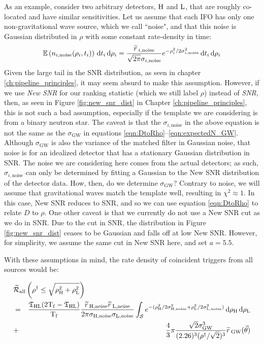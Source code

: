 As an example, consider two arbitrary detectors, $\mathrm{H}$ and $\mathrm{L}$, that are roughly co-located and have similar sensitivities. Let us assume that each \ac{IFO} has only one non-gravitational wave source, which we call ``noise", and that this noise is Gaussian distributed in $\rho$ with some constant rate-density in time:
\begin{equation}
\mathbb{E}\left(n_{i,\mathrm{noise}}(\rho_i,t_i)\right)\,\mathrm{d} t_i \,\mathrm{d}\rho_i = \frac{\widetilde{r}\,_{i,\mathrm{noise}}}{\sqrt{2\pi} \sigma_{i,\mathrm{noise}}} e^{-\rho_i^2 / 2\sigma_{i,\mathrm{noise}}^2} \,\mathrm{d} t_i \,\mathrm{d}\rho_i
\end{equation}
Given the large tail in the \ac{SNR} distribution, as seen in chapter \ref{ch:pipeline_principles}, it may seem absurd to make this assumption. However, if we use \emph{New \ac{SNR}} for our ranking statistic (which we still label $\rho$) instead of \emph{\ac{SNR}}, then, as seen in Figure \ref{fig:new_snr_dist} in Chapter \ref{ch:pipeline_principles}, this is not such a bad assumption, especially if the template we are considering is from a binary neutron star. The caveat is that the $\sigma_{i,\mathrm{noise}}$ in the above equation is not the same as the $\sigma_{\mathrm{GW}}$ in equations \ref{eqn:DtoRho}--\ref{eqn:expectedN_GW}. Although $\sigma_{\mathrm{GW}}$ is also the variance of the matched filter in Gaussian noise, that noise is for an idealized detector that has a stationary Gaussian distribution in \ac{SNR}. The noise we are considering here comes from the actual detectors; as such, $\sigma_{i,\mathrm{noise}}$ can only be determined by fitting a Gaussian to the New \ac{SNR} distribution of the detector data. How, then, do we determine $\sigma_{\mathrm{GW}}$? Contrary to noise, we will assume that gravitational waves match the template well, resulting in $\chi^2 \approx 1$. In this case, New \ac{SNR} reduces to \ac{SNR}, and so we can use equation \ref{eqn:DtoRho} to relate $D$ to $\rho$. One other caveat is that we currently do not use a New \ac{SNR} cut as we do in \ac{SNR}. Due to the cut in \ac{SNR}, the distribution in Figure \ref{fig:new_snr_dist} ceases to be Gaussian and falls off at low New \ac{SNR}. However, for simplicity, we assume the same cut in New SNR here, and set $a = 5.5$.

With these assumptions in mind, the rate density of coincident triggers from all sources would be:

\begin{eqnarray}
\label{eqn:exampleSources}
\lefteqn{ \tR_{\mathrm{all}} \left(\rho^\dagger \leq \sqrt{\rho_\varH^2 + \rho_\varL^2} \right) } \nonumber \\
& = & \frac{\coincT_{\varH\varL}(2\Tf - \coincT_{\varH\varL})}{\Tf} \frac{\rsrc_{\varH,\mathrm{noise}}\rsrc_{\varL,\mathrm{noise}}}{2\pi \sigma_{\varH,\mathrm{noise}} \sigma_{\varL,\mathrm{noise}}} \int_{\mathcal{S}} e^{-(\rho_{\varH}^2 / 2\sigma_{\varH,\mathrm{noise}}^2 + \rho_{\varL}^2 / 2\sigma_{\varL,\mathrm{noise}}^2 )} \d \rho_{\varH} \d \rho_{\varL} \nonumber \\
 & + & \frac{4}{3} \pi \frac{\sqrt{2} \sigma_{\mathrm{GW}}^3}{(2.26)^3 (\rho^\dagger / \sqrt{2})^3} \rsrc_{\mathrm{GW}}(\vec{\theta})
\end{eqnarray}

